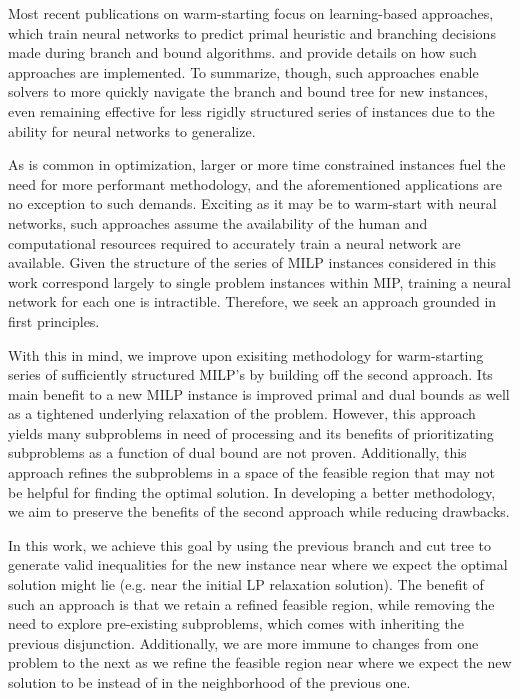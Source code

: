 \documentclass[10pt]{article}
\begin{document}
	Most recent publications on warm-starting focus on learning-based approaches, which train neural networks to predict primal heuristic and branching decisions made during branch and bound algorithms. \cite{google} and \cite{l2b} provide details on how such approaches are implemented. To summarize, though, such approaches enable solvers to more quickly navigate the branch and bound tree for new instances, even remaining effective for less rigidly structured series of instances due to the ability for neural networks to generalize. 
		
	As is common in optimization, larger or more time constrained instances fuel the need for more performant methodology, and the aforementioned applications are no exception to such demands. Exciting as it may be to warm-start with neural networks, such approaches assume the availability of the human and computational resources required to accurately train a neural network are available. Given the structure of the series of MILP instances considered in this work correspond largely to single problem instances within MIP, training a neural network for each one is intractible. Therefore, we seek an approach grounded in first principles.
	
	With this in mind, we improve upon exisiting methodology for warm-starting series of sufficiently structured MILP's by building off the second approach. Its main benefit to a new MILP instance is improved primal and dual bounds as well as a tightened underlying relaxation of the problem. However, this approach yields many subproblems in need of processing and its benefits of prioritizating subproblems as a function of dual bound are not proven. Additionally, this approach refines the subproblems in a space of the feasible region that may not be helpful for finding the optimal solution. In developing a better methodology, we aim to preserve the benefits of the second approach while reducing drawbacks.
	
	In this work, we achieve this goal by using the previous branch and cut tree to generate valid inequalities for the new instance near where we expect the optimal solution might lie (e.g. near the initial LP relaxation solution). The benefit of such an approach is that we retain a refined feasible region, while removing the need to explore pre-existing subproblems, which comes with inheriting the previous disjunction. Additionally, we are more immune to changes from one problem to the next as we refine the feasible region near where we expect the new solution to be instead of in the neighborhood of the previous one.
	
\end{document}
